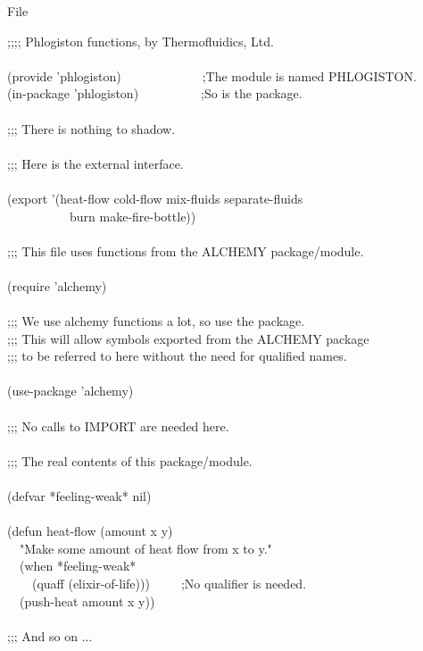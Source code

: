 {\newpage
\clearpage
\samepage \begin{table}%
\caption{File \protect{}}
\label{PHLOGISTON-FILE-TABLE}
\begin{lisp}
;;;; Phlogiston functions, by Thermofluidics, Ltd. \\ 
 \\ [4pt]
(provide 'phlogiston)~~~~~~~~~~~~~;The module is named PHLOGISTON. \\ 
(in-package 'phlogiston)~~~~~~~~~~;So is the package. \\ 
 \\ [4pt]
;;; There is nothing to shadow. \\ 
 \\ [4pt]
;;; Here is the external interface. \\ 
 \\ [4pt]
(export '(heat-flow cold-flow mix-fluids separate-fluids \\ 
~~~~~~~~~~burn make-fire-bottle)) \\ 
 \\ [4pt]
;;; This file uses functions from the ALCHEMY package/module. \\ 
 \\ [4pt]
(require 'alchemy) \\ 
 \\ [4pt]
;;; We use alchemy functions a lot, so use the package. \\ 
;;; This will allow symbols exported from the ALCHEMY package \\ 
;;; to be referred to here without the need for qualified names. \\ 
 \\ [4pt]
(use-package 'alchemy) \\ 
 \\ [4pt]
;;; No calls to IMPORT are needed here. \\ 
 \\ [4pt]
;;; The real contents of this package/module. \\ 
\\ [4pt]
(defvar *feeling-weak* nil) \\ 
 \\ [4pt]
(defun heat-flow (amount x y) \\ 
~~"Make some amount of heat flow from x to y." \\ 
~~(when *feeling-weak* \\ 
~~~~(quaff (elixir-of-life)))~~~~~;No qualifier is needed. \\ 
~~(push-heat amount x y)) \\ 
 \\ [4pt]
;;; And so on ...
\end{lisp}
\vfill
\end{table}
}

